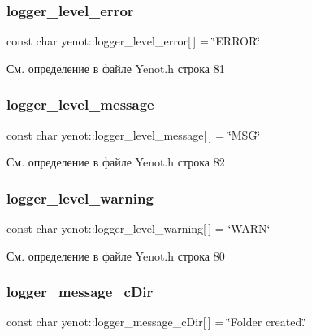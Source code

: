 \subsubsection{\texorpdfstring{logger\+\_\+level\+\_\+error}{logger\_level\_error}}
{\footnotesize\ttfamily const char yenot\+::logger\+\_\+level\+\_\+error\mbox{[}$\,$\mbox{]} = \char`\"{}E\+R\+R\+OR\char`\"{}}



См. определение в файле Yenot.\+h строка 81

\mbox{\label{namespaceyenot_a536380830aa21975126348216a729b08}} 
\subsubsection{\texorpdfstring{logger\+\_\+level\+\_\+message}{logger\_level\_message}}
{\footnotesize\ttfamily const char yenot\+::logger\+\_\+level\+\_\+message\mbox{[}$\,$\mbox{]} = \char`\"{}M\+SG\char`\"{}}



См. определение в файле Yenot.\+h строка 82

\mbox{\label{namespaceyenot_ab09d0dabe8840893fe9dc4a855ffc2fa}} 
\subsubsection{\texorpdfstring{logger\+\_\+level\+\_\+warning}{logger\_level\_warning}}
{\footnotesize\ttfamily const char yenot\+::logger\+\_\+level\+\_\+warning\mbox{[}$\,$\mbox{]} = \char`\"{}W\+A\+RN\char`\"{}}



См. определение в файле Yenot.\+h строка 80

\mbox{\label{namespaceyenot_a674d34d95501a1071db0ac7b39c64f57}} 
\subsubsection{\texorpdfstring{logger\+\_\+message\+\_\+c\+Dir}{logger\_message\_cDir}}
{\footnotesize\ttfamily const char yenot\+::logger\+\_\+message\+\_\+c\+Dir\mbox{[}$\,$\mbox{]} = \char`\"{}Folder created.\char`\"{}}



